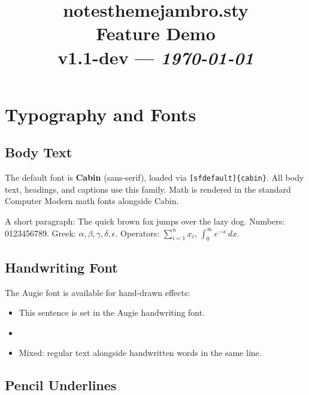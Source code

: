 \documentclass[11pt,a4paper]{article}
\title{\vspace{-2cm}\color{BoEblue}
\textbf{notesthemejambro.sty}\\[0.3em]
\Large Feature Demo\\[0.3em]
\large v1.1-dev --- \textit{\today}
}
\author{}
\date{}
\begin{document}
\maketitle
\tableofcontents
\newpage
\vspace{-1cm}

\section{Typography and Fonts}

\subsection{Body Text}

The default font is \textbf{Cabin} (sans-serif), loaded via \verb|[sfdefault]{cabin}|. All body text, headings, and captions use this family. Math is rendered in the standard Computer Modern math fonts alongside Cabin.

A short paragraph: The quick brown fox jumps over the lazy dog. Numbers: 0123456789. Greek: $\alpha, \beta, \gamma, \delta, \epsilon$. Operators: $\sum_{i=1}^{n} x_i$, $\int_0^\infty e^{-x}\,dx$.

\subsection{Handwriting Font}

The Augie font is available for hand-drawn effects:

\begin{itemize}
    \item {\hand This sentence is set in the Augie handwriting font.}
    \item {}
    \item Mixed: regular text alongside {\hand handwritten words} in the same line.
\end{itemize}

\subsection{Pencil Underlines}
\end{document}
